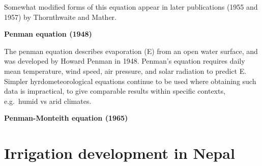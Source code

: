 \documentclass[
]{book}
\begin{document}
Somewhat modified forms of this equation appear in later publications (1955 and 1957) by Thornthwaite and Mather.

\textbf{Penman equation (1948)}

The penman equation describes evaporation (E) from an open water surface, and was developed by Howard Penman in 1948. Penman's equation requires daily mean temperature, wind speed, air pressure, and solar radiation to predict E. Simpler hyrdometeorological equations continue to be used where obtaining such data is impractical, to give comparable results within specific contexts, e.g.~humid vs arid climates.

\textbf{Penman-Monteith equation (1965)}

\hypertarget{irrigation-development-in-nepal}{%
\section{Irrigation development in Nepal}\label{irrigation-development-in-nepal}}
\end{document}
